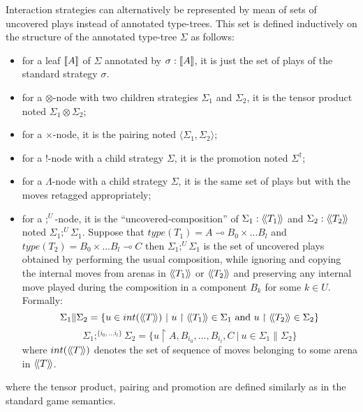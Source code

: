 Interaction strategies can alternatively be represented by mean of sets of
uncovered plays instead of annotated type-trees. This set is defined
inductively on the structure of the annotated type-tree $\Sigma$ as follows:
\begin{itemize}
\item for a leaf ${[\![ A ]\!]}$ of $\Sigma$ annotated by $\sigma :{[\![ A ]\!]}$, it is just the set of plays of the standard strategy $\sigma$.
\item for a $\otimes$-node with two children strategies $\Sigma_1$ and $\Sigma_2$, it is the tensor product noted $\Sigma_1 \otimes \Sigma_2$;
\item for a $\times$-node, it is the pairing noted $\langle \Sigma_1, \Sigma_2 \rangle$;
\item for a $!$-node with a child strategy $\Sigma$, it is the promotion noted $\Sigma^\dagger$;
\item for a $\Lambda$-node with a child strategy $\Sigma$, it is the same set of plays but with the moves retagged appropriately;

\item for a $;^U$-node, it is the ``uncovered-composition'' of $\Sigma_1 : {\langle\!\langle T_1 \rangle\!\rangle}$ and $\Sigma_2 :{\langle\!\langle T_2 \rangle\!\rangle}$ noted $\Sigma_1
;^U \Sigma_1$. Suppose that $type(T_1) =
A \multimap B_0 \times \ldots B_l$ and $type(T_2) = B_0 \times \ldots B_l \multimap C$
then $\Sigma_1
;^U \Sigma_1$ is the set of uncovered plays
obtained by performing the usual composition, while ignoring and
copying the internal moves from arenas in ${\langle\!\langle T_1 \rangle\!\rangle}$ or ${\langle\!\langle T_2 \rangle\!\rangle}$
and preserving any internal move played during the composition in a component $B_k$ for some $k \in U$. Formally:
$$ \Sigma_1 \| \Sigma_2 = \{ u \in int({\langle\!\langle T \rangle\!\rangle}) \ | \ u \upharpoonright {\langle\!\langle T_1 \rangle\!\rangle} \in \Sigma_1 \mbox{ and } u \upharpoonright {\langle\!\langle T_2 \rangle\!\rangle} \in \Sigma_2 \}$$
$$ \Sigma_1 ;^{\{i_0, \ldots i_l\}} \Sigma_2 = \{ u \upharpoonright A, B_{i_0}, \ldots, B_{i_l}, C \ | \ u \in \Sigma_1 \| \Sigma_2 \}$$
where $int({\langle\!\langle T \rangle\!\rangle})$ denotes the set of sequence of moves belonging to some arena in ${\langle\!\langle T \rangle\!\rangle}$.


\end{itemize}
where the tensor product, pairing and promotion are defined similarly as in the standard game semantics.



